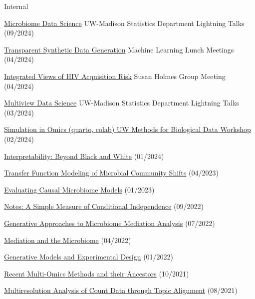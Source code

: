 \documentclass[letterpaper]{article}
\renewenvironment{itemize}{
  \begin{list}{}{
    \setlength{\leftmargin}{1.5em}
  }
}{
  \end{list}
}
\begin{document}
Internal
\begin{itemize}
  \item \href{https://go.wisc.edu/05h9p7}{Microbiome Data Science} UW-Madison Statistics Department Lightning Talks (09/2024)
  \item \href{https://go.wisc.edu/694o2e}{Transparent Synthetic Data Generation} Machine Learning Lunch Meetings (04/2024)
  \item \href{https://go.wisc.edu/wi1952}{Integrated Views of HIV Acquisition Risk} Susan Holmes Group Meeting (04/2024)
  \item \href{https://krisrs1128.github.io/talks/2024/20240307/20240307.html#1}{Multiview Data Science} UW-Madison Statistics Department Lightning Talks (03/2024)
  \item \href{https://krisrs1128.github.io/talks/2024/20240207/20240207.html#1}{Simulation in Omics (\href{https://connect.doit.wisc.edu/content/f01c0d0c-ef3a-4129-bfcd-eb17ae109a89/simulation.html}{quarto}, \href{https://colab.research.google.com/drive/1IyMEQJwkslPzL9FYd5atvyGORqW9IrCI?usp=sharing}{colab}) UW Methods for Biological Data Workshop} (02/2024)
  \item \href{https://github.com/krisrs1128/talks/blob/master/2024/20240119/20240119.pptx}{Interpretability: Beyond Black and White} (01/2024)
  \item \href{https://krisrs1128.github.io/talks/2023/20230414/20230414.html}{Transfer Function Modeling of Microbial Community Shifts} (04/2023)
  \item \href{https://krisrs1128.github.io/talks/2023/20230120/20230120.html}{Evaluating Causal Microbiome Models} (01/2023)
  \item \href{https://krisrs1128.github.io/talks/2022/20220930/20220930.html}{Notes: A Simple Measure of Conditional Independence} (09/2022)
  \item \href{https://drive.google.com/file/d/1n6gEubzFuIRRRYxGewY81k1ZdQS24oKg/view}{Generative Approaches to Microbiome Mediation Analysis} (07/2022)
  \item \href{https://drive.google.com/file/d/17xNjMA-pH70wM_gknUnM0A5gr0k87gAo/view}{Mediation and the Microbiome} (04/2022)
  \item \href{https://drive.google.com/file/d/1OMIulBki_0an7Lwd0MKPGH1f0OdK0etH/view}{Generative Models and Experimental Design} (01/2022)
  \item \href{https://drive.google.com/file/d/1L2crRIcdbql__XZdJuiRXkAKsvwrIZLO/view}{Recent Multi-Omics Methods and their Ancestors} (10/2021)
  \item \href{https://drive.google.com/file/d/1VcXF0fAK2IlA3yXeqnJ_1CGC6BP4zPqp/view}{Multiresolution Analysis of Count Data through Topic Alignment} (08/2021)
\end{itemize}
\end{document}
